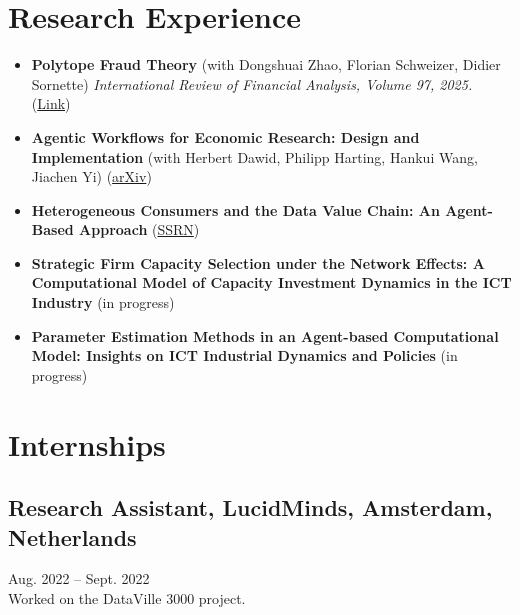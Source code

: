 \documentclass[11pt,a4paper]{article}
\begin{document}
\section*{Research Experience}
\begin{itemize}[noitemsep]
  \item \textbf{Polytope Fraud Theory} (with Dongshuai Zhao, Florian Schweizer, Didier Sornette) \textit{International Review of Financial Analysis, Volume 97, 2025.} (\href{https://www.sciencedirect.com/science/article/pii/S1057521924006665?via%3Dihub}{Link})
  \vspace{0.5em}
  
  \item \textbf{Agentic Workflows for Economic Research: Design and Implementation} (with Herbert Dawid, Philipp Harting, Hankui Wang, Jiachen Yi) (\href{https://arxiv.org/abs/2504.09736}{arXiv})
  \vspace{0.5em}
  
    \item \textbf{Heterogeneous Consumers and the Data Value Chain: An Agent-Based Approach} (\href{https://papers.ssrn.com/sol3/papers.cfm?abstract_id=5235196}{SSRN})
    \vspace{0.5em}
    
      \item \textbf{Strategic Firm Capacity Selection under the Network Effects: A Computational Model of Capacity Investment Dynamics in the ICT Industry} (in progress)
      \vspace{0.5em}
      
      \item \textbf{Parameter Estimation Methods in an Agent-based Computational Model: Insights on ICT Industrial Dynamics and Policies} (in progress)
\end{itemize}

\section*{Internships}
\subsection*{Research Assistant, LucidMinds, Amsterdam, Netherlands}
Aug. 2022 -- Sept. 2022 \\
Worked on the DataVille 3000 project.
\end{document}
